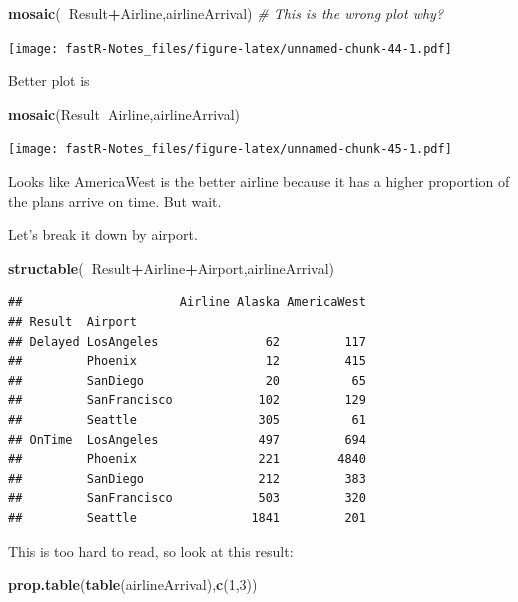 \documentclass[]{book}
\newenvironment{Shaded}{\begin{snugshade}}{\end{snugshade}}
\newcommand{\KeywordTok}[1]{\textcolor[rgb]{0.13,0.29,0.53}{\textbf{#1}}}
\newcommand{\DecValTok}[1]{\textcolor[rgb]{0.00,0.00,0.81}{#1}}
\newcommand{\CommentTok}[1]{\textcolor[rgb]{0.56,0.35,0.01}{\textit{#1}}}
\newcommand{\OperatorTok}[1]{\textcolor[rgb]{0.81,0.36,0.00}{\textbf{#1}}}
\newcommand{\NormalTok}[1]{#1}
\theoremstyle{definition}
\theoremstyle{definition}
\theoremstyle{definition}
\theoremstyle{remark}
\begin{document}
\begin{Shaded}
\begin{Highlighting}[]
\KeywordTok{mosaic}\NormalTok{(}\OperatorTok{~}\NormalTok{Result}\OperatorTok{+}\NormalTok{Airline,airlineArrival) }\CommentTok{# This is the wrong plot why?}
\end{Highlighting}
\end{Shaded}

\texttt{[image: fastR-Notes\_files/figure-latex/unnamed-chunk-44-1.pdf]}

Better plot is

\begin{Shaded}
\begin{Highlighting}[]
\KeywordTok{mosaic}\NormalTok{(Result}\OperatorTok{~}\NormalTok{Airline,airlineArrival)}
\end{Highlighting}
\end{Shaded}

\texttt{[image: fastR-Notes\_files/figure-latex/unnamed-chunk-45-1.pdf]}

Looks like AmericaWest is the better airline because it has a higher
proportion of the plans arrive on time. But wait.

Let's break it down by airport.

\begin{Shaded}
\begin{Highlighting}[]
\KeywordTok{structable}\NormalTok{(}\OperatorTok{~}\NormalTok{Result}\OperatorTok{+}\NormalTok{Airline}\OperatorTok{+}\NormalTok{Airport,airlineArrival)}
\end{Highlighting}
\end{Shaded}

\begin{verbatim}
##                      Airline Alaska AmericaWest
## Result  Airport                                
## Delayed LosAngeles               62         117
##         Phoenix                  12         415
##         SanDiego                 20          65
##         SanFrancisco            102         129
##         Seattle                 305          61
## OnTime  LosAngeles              497         694
##         Phoenix                 221        4840
##         SanDiego                212         383
##         SanFrancisco            503         320
##         Seattle                1841         201
\end{verbatim}

This is too hard to read, so look at this result:

\begin{Shaded}
\begin{Highlighting}[]
\KeywordTok{prop.table}\NormalTok{(}\KeywordTok{table}\NormalTok{(airlineArrival),}\KeywordTok{c}\NormalTok{(}\DecValTok{1}\NormalTok{,}\DecValTok{3}\NormalTok{))}
\end{Highlighting}
\end{Shaded}
\end{document}

